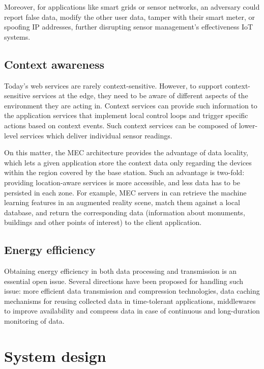 Moreover, for applications like smart grids or sensor networks, an adversary could report false data, modify the other user data, tamper with their smart meter, or spoofing IP addresses, further disrupting sensor management's effectiveness IoT systems.

\subsection{Context awareness}

Today's web services are rarely context-sensitive. However, to support context-sensitive services at the edge, they need to be aware of different aspects of the environment they are acting in. Context services can provide such information to the application services that implement local control loops and trigger specific actions based on context events. Such context services can be composed of lower-level services which deliver individual sensor readings.

On this matter, the MEC architecture provides the advantage of data locality, which lets a given application store the context data only regarding the devices within the region covered by the base station. Such an advantage is two-fold: providing location-aware services is more accessible, and less data has to be persisted in each zone. For example, MEC servers in \cite{mobile-augmented-reality} can retrieve the machine learning features in an augmented reality scene, match them against a local database, and return the corresponding data (information about monuments, buildings and other points of interest) to the client application.

\subsection{Energy efficiency}

Obtaining energy efficiency in both data processing and transmission is an essential open issue. Several directions have been proposed for handling such issue: more efficient data transmission and compression technologies, data caching mechanisms for reusing collected data in time-tolerant applications, middlewares to improve availability and compress data in case of continuous and long-duration monitoring of data.

\section{System design}
\label{sec:technicals}

